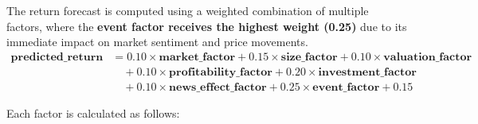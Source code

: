 \documentclass[3p,times,procedia]{elsarticle}
\begin{document}
The return forecast is computed using a weighted \allowbreak combination of multiple factors, where the \textbf{event factor receives the highest weight (0.25)} due to its immediate impact on market sentiment and price movements.
\begin{align}
\mathbf{predicted\_return} &= 0.10 \times \mathbf{market\_factor} + 0.15 \times \mathbf{size\_factor} + 0.10 \times \mathbf{valuation\_factor} \nonumber \\
&\quad + 0.10 \times \mathbf{profitability\_factor} + 0.20 \times \mathbf{investment\_factor} \nonumber \\
&\quad + 0.10 \times \mathbf{news\_effect\_factor} + \mathbf{0.25} \times \mathbf{event\_factor} + 0.15
\end{align}


Each factor is calculated as follows:
\end{document}
